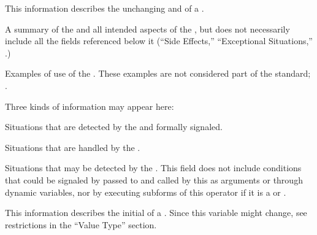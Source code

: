 \endsubsubsection%


This information describes the unchanging  and  of 
a .

\endsubsubsection%


A summary of the  and all intended aspects of the , 
but does not necessarily include all the fields referenced below it 
(``Side Effects,'' ``Exceptional Situations,'' \etc.)

\endsubsubsection%


Examples of use of the .
These examples are not considered part of the standard;
\seesection\RemovableText.

\endsubsubsection%


  Three kinds of information may appear here:
\beginlist
\item{\bull}
Situations that are detected by the  and formally signaled.
\item{\bull}
Situations that are handled by the .
\item{\bull}
Situations that may be detected by the .
\endlist
This field does not include conditions that could
be signaled by  passed to and called by this 
as arguments or through dynamic variables, nor by executing subforms of this
operator if it is a  or .

\endsubsubsection%


This information describes the initial  of a .
Since this variable might change, see  restrictions in the ``Value Type'' section.

